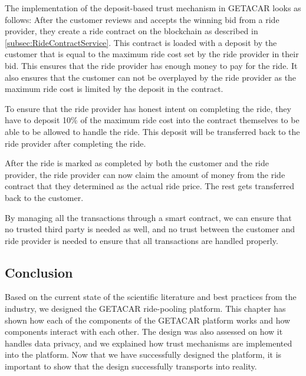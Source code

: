 The implementation of the deposit-based trust mechanism in GETACAR looks as follows:
After the customer reviews and accepts the winning bid from a ride provider, they create a ride contract on the blockchain as described in \ref{subsec:RideContractService}. This contract is loaded with a deposit by the customer that is equal to the maximum ride cost set by the ride provider in their bid. This ensures that the ride provider has enough money to pay for the ride. It also ensures that the customer can not be overplayed by the ride provider as the maximum ride cost is limited by the deposit in the contract. 

To ensure that the ride provider has honest intent on completing the ride, they have to deposit 10\% of the maximum ride cost into the contract themselves to be able to be allowed to handle the ride. This deposit will be transferred back to the ride provider after completing the ride. 

After the ride is marked as completed by both the customer and the ride provider, the ride provider can now claim the amount of money from the ride contract that they determined as the actual ride price. The rest gets transferred back to the customer.

By managing all the transactions through a smart contract, we can ensure that no trusted third party is needed as well, and no trust between the customer and ride provider is needed to ensure that all transactions are handled properly.

\subsection{Conclusion}
Based on the current state of the scientific literature and best practices from the industry, we designed the GETACAR ride-pooling platform. This chapter has shown how each of the components of the GETACAR platform works and how components interact with each other. The design was also assessed on how it handles data privacy, and we explained how trust mechanisms are implemented into the platform. Now that we have successfully designed the platform, it is important to show that the design successfully transports into reality. 